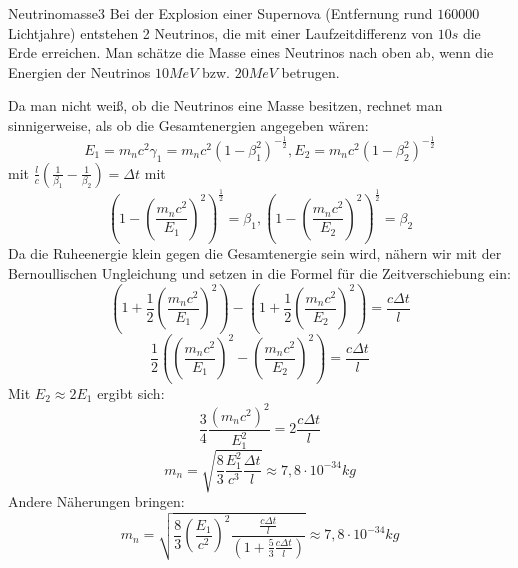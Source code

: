 


\begin{problem}{Neutrinomasse}{3}
Bei der Explosion einer Supernova (Entfernung rund $160000$ Lichtjahre) entstehen 2 Neutrinos, die mit einer Laufzeitdifferenz von $10\unit{s}$ die Erde erreichen. Man schätze die Masse eines Neutrinos nach oben ab, wenn die Energien der Neutrinos $10\unit{MeV}$ bzw. $20\unit{MeV}$ betrugen.
\begin{solution}
Da man nicht weiß, ob die Neutrinos eine Masse besitzen, rechnet man sinnigerweise, als ob die Gesamtenergien angegeben wären:
$$E_1=m_nc^2\gamma_1=m_nc^2\left(1-\beta_1^2\right)^{-\frac 12}, E_2= m_nc^2\left(1-\beta_2^2\right)^{-\frac 12}$$
mit $\frac lc\left(\frac 1{\beta_1}-\frac 1{\beta_2}\right)=\Delta t$
mit 
$$\left(1-\left(\frac{m_nc^2}{E_1}\right)^2\right)^{\frac 12}=\beta_1, \left(1-\left(\frac{m_nc^2}{E_2}\right)^2\right)^{\frac 12}=\beta_2$$
Da die Ruheenergie klein gegen die Gesamtenergie sein wird, nähern wir mit der Bernoullischen Ungleichung und setzen in die Formel für die Zeitverschiebung ein:
$$\left(1+\frac 12\left(\frac{m_nc^2}{E_1}\right)^2\right)-\left(1+\frac 12\left(\frac{m_nc^2}{E_2}\right)^2\right)=\frac{c\Delta t}{l}$$
$$\frac 12\left(\left(\frac{m_nc^2}{E_1}\right)^2-\left(\frac{m_nc^2}{E_2}\right)^2\right)=\frac{c\Delta t}{l}$$
Mit $E_2\approx 2E_1$ ergibt sich:
$$\frac 34\frac{(m_nc^2)^2}{E_1^2}=2\frac{c\Delta t}l$$
$$m_n=\sqrt{\frac 83 \frac{E_1^2}{c^3}\frac{\Delta t}{l} }\approx 7,8\cdot 10^{-34}\unit{kg}$$
Andere Näherungen bringen:
$$m_n=\sqrt{\frac 83\left(\frac{E_1}{c^2}\right)^2\frac{\frac{c\Delta t}l}{\left( 1+\frac 53 \frac{c\Delta t}{l}\right)}}\approx 7,8\cdot 10^{-34}\unit{kg}$$
\end{solution}
\end{problem}

